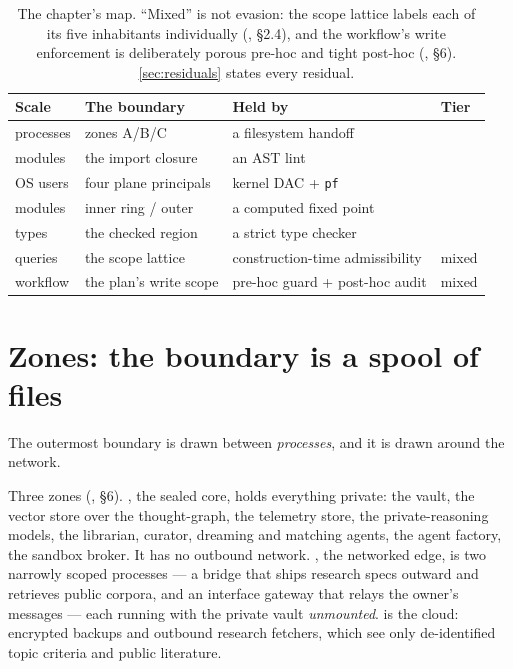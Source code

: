 \begin{table}[t]
  \centering\footnotesize
  \begin{tabular}{@{}llll@{}}
    \toprule
    \textbf{Scale} & \textbf{The boundary} & \textbf{Held by} & \textbf{Tier} \\
    \midrule
    processes  & zones A/B/C           & a filesystem handoff        & \tstruct{} \\
    modules    & the import closure    & an AST lint                 & \tstatic{} \\
    OS users   & four plane principals & kernel DAC + \texttt{pf} & \tstruct{} \\
    modules    & inner ring / outer    & a computed fixed point      & \tstatic{} \\
    types      & the checked region    & a strict type checker       & \tstatic{} \\
    queries    & the scope lattice     & construction-time admissibility & mixed \\
    workflow   & the plan's write scope & pre-hoc guard + post-hoc audit & mixed \\
    \bottomrule
  \end{tabular}
  \caption[The five scales]{The chapter's map. ``Mixed'' is not evasion: the scope
    lattice labels each of its five inhabitants individually
    (, \S 2.4), and the workflow's write enforcement
    is deliberately porous pre-hoc and tight post-hoc
    (, \S 6). \autoref{sec:residuals} states every
    residual.}
  \label{tab:five-scales}
\end{table}

\section{Zones: the boundary is a spool of files}
\label{sec:zones}

The outermost boundary is drawn between \emph{processes}, and it is drawn around
the network.

Three zones (, \S 6). \zoneA{}, the sealed
core, holds everything private: the vault, the vector store over the thought-graph,
the telemetry store, the private-reasoning models, the librarian, curator, dreaming
and matching agents, the agent factory, the sandbox broker. It has no outbound
network. \zoneB{}, the networked edge, is two narrowly scoped processes --- a
bridge that ships research specs outward and retrieves public corpora, and an
interface gateway that relays the owner's messages --- each running with the
private vault \emph{unmounted}. \zoneC{} is the cloud: encrypted backups and
outbound research fetchers, which see only de-identified topic criteria and public
literature.

